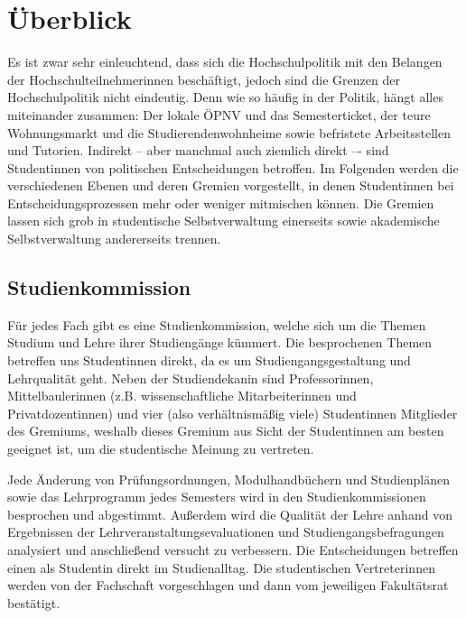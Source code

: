 \section{Überblick}
\label{hopo}

Es ist zwar sehr einleuchtend, dass sich die Hochschulpolitik mit den Belangen der Hochschulteilnehmerinnen beschäftigt, jedoch sind die Grenzen der Hochschulpolitik nicht eindeutig. Denn wie so häufig in der Politik, hängt alles miteinander zusammen: Der lokale ÖPNV und das Semesterticket, der teure Wohnungsmarkt und die Studierendenwohnheime sowie befristete Arbeitsstellen und Tutorien. Indirekt -- aber manchmal auch ziemlich direkt –- sind Studentinnen von politischen Entscheidungen betroffen. Im Folgenden werden die verschiedenen Ebenen und deren Gremien vorgestellt, in denen Studentinnen bei Entscheidungsprozessen mehr oder weniger mitmischen können. Die Gremien lassen sich grob in studentische Selbstverwaltung einerseits sowie akademische Selbstverwaltung andererseits trennen.


\subsection{Studienkommission}
Für jedes Fach gibt es eine Studienkommission, welche sich um die Themen Studium und Lehre ihrer Studiengänge kümmert. Die besprochenen Themen betreffen uns Studentinnen direkt, da es um Studiengangsgestaltung und Lehrqualität geht. Neben der Studiendekanin sind Professorinnen, Mittelbaulerinnen (z.B. wissenschaftliche Mitarbeiterinnen und Privatdozentinnen) und vier (also verhältnismäßig viele) Studentinnen Mitglieder des Gremiums, weshalb dieses Gremium aus Sicht der Studentinnen am besten geeignet ist, um die studentische Meinung zu vertreten.

Jede Änderung von Prüfungsordnungen, Modulhandbüchern und Studienplänen sowie das Lehrprogramm jedes Semesters wird in den Studienkommissionen besprochen und abgestimmt. Außerdem wird die Qualität der Lehre anhand von Ergebnissen der Lehrveranstaltungsevaluationen und Studiengangsbefragungen analysiert und anschließend versucht zu verbessern. Die Entscheidungen betreffen einen als Studentin direkt im Studienalltag. Die studentischen Vertreterinnen werden von der Fachschaft vorgeschlagen und dann vom jeweiligen Fakultätsrat bestätigt.

